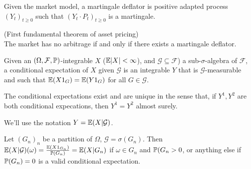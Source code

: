 \documentclass[a4paper]{article}
\begin{document}
\begin{defi}
Given the market model, a martingale deflator is positive adapted process $(Y_t)_{t \geq 0}$ such that $(Y_t \cdot P_t)_{t \geq 0}$ is a martingale.
\end{defi}

\begin{thm} (First fundamental theorem of asset pricing)\\
The market has no arbitrage if and only if there exists a martingale deflator.
\end{thm}

\begin{defi}
Given an $(\Omega,\mathcal{F},\P)$-integrable $X$ ($\E|X| < \infty$), and $\mathcal{G} \subseteq \mathcal{F}$) a sub-$\sigma$-algebra of $\mathcal{F}$, a conditional expectation of $X$ given $\mathcal{G}$ is an integrable $Y$ that is $\mathcal{G}$-measurable and such that $\E(X 1_G) = \E(Y 1_G)$ for all $G \in \mathcal{G}$.
\end{defi}

\begin{thm}
The conditional expectations exist and are unique in the sense that, if $Y^1,Y^2$ are both conditional expecations, then $Y^1=Y^2$ almost surely.
\end{thm}

We'll use the notation $Y = \E(X|\mathcal{G})$.

\begin{eg}
Let $(G_n)_n$ be a partition of $\Omega$, $\mathcal{G} = \sigma({G_n})$. Then $\E(X|\mathcal{G})(\omega) = \frac{\E(X1_{G_n})}{\P(G_n)} = \E(X|G_n)$ if $\omega \in G_n$ and $\P(G_n>0$, or anything else if $\P(G_n) = 0$ is a valid conditional expectation.
\end{eg}
\end{document}
